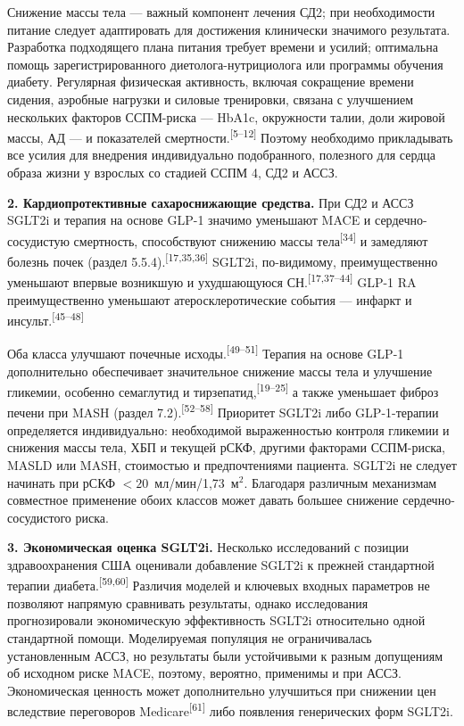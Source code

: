 \documentclass[11pt,a4paper]{article}
\newcommand{\src}[1]{\textsuperscript{[#1]}}
\newcommand{\unitgfr}{мл/мин/1,73~м$^2$}
\begin{document}
Снижение массы тела --- важный компонент лечения СД2; при необходимости питание следует адаптировать для достижения клинически значимого результата. Разработка подходящего плана питания требует времени и усилий; оптимальна помощь зарегистрированного диетолога-нутрициолога или программы обучения диабету. Регулярная физическая активность, включая сокращение времени сидения, аэробные нагрузки и силовые тренировки, связана с улучшением нескольких факторов ССПМ-риска --- HbA1c, окружности талии, доли жировой массы, АД --- и показателей смертности.\src{5--12} Поэтому необходимо прикладывать все усилия для внедрения индивидуально подобранного, полезного для сердца образа жизни у взрослых со стадией ССПМ 4, СД2 и АССЗ.

\textbf{2. Кардиопротективные сахароснижающие средства.} При СД2 и АССЗ SGLT2i и терапия на основе GLP-1 значимо уменьшают MACE и сердечно-сосудистую смертность, способствуют снижению массы тела\src{34} и замедляют болезнь почек (раздел 5.5.4).\src{17,35,36} SGLT2i, по-видимому, преимущественно уменьшают впервые возникшую и ухудшающуюся СН.\src{17,37--44} GLP-1 RA преимущественно уменьшают атеросклеротические события --- инфаркт и инсульт.\src{45--48}

Оба класса улучшают почечные исходы.\src{49--51} Терапия на основе GLP-1 дополнительно обеспечивает значительное снижение массы тела и улучшение гликемии, особенно семаглутид и тирзепатид,\src{19--25} а также уменьшает фиброз печени при MASH (раздел 7.2).\src{52--58} Приоритет SGLT2i либо GLP-1-терапии определяется индивидуально: необходимой выраженностью контроля гликемии и снижения массы тела, ХБП и текущей рСКФ, другими факторами ССПМ-риска, MASLD или MASH, стоимостью и предпочтениями пациента. SGLT2i не следует начинать при рСКФ $<20$~\unitgfr. Благодаря различным механизмам совместное применение обоих классов может давать большее снижение сердечно-сосудистого риска.

\textbf{3. Экономическая оценка SGLT2i.} Несколько исследований с позиции здравоохранения США оценивали добавление SGLT2i к прежней стандартной терапии диабета.\src{59,60} Различия моделей и ключевых входных параметров не позволяют напрямую сравнивать результаты, однако исследования прогнозировали экономическую эффективность SGLT2i относительно одной стандартной помощи. Моделируемая популяция не ограничивалась установленным АССЗ, но результаты были устойчивыми к разным допущениям об исходном риске MACE, поэтому, вероятно, применимы и при АССЗ. Экономическая ценность может дополнительно улучшиться при снижении цен вследствие переговоров Medicare\src{61} либо появления генерических форм SGLT2i.
\end{document}
